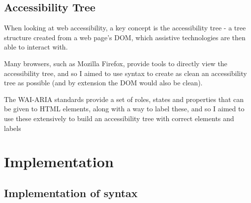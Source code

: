 \documentclass[ %
                    author={Aleena Baig},
                supervisor={Dr Simon Lock},
                    degree={BSc},
                     title={On Making Web Accessible Graphs},
                  subtitle={},
                      year={2019} ]{dissertation}
\begin{document}
\section{Accessibility Tree}

When looking at web accessibility, a key concept is the accessibility tree - a tree structure created from a web page's DOM, which assistive technologies are then able to interact with.


Many browsers, such as Mozilla Firefox, provide tools to directly view the accessibility tree, and so I aimed to use syntax to create as clean an accessibility tree as possible (and by extension the DOM would also be clean).

The WAI-ARIA standards provide a set of roles, states and properties that can be given to HTML elements, along with a way to label these, and so I aimed to use these extensively to build an accessibility tree with correct elements and labels


\chapter{Implementation}

\section{Implementation of syntax}



\end{document}

